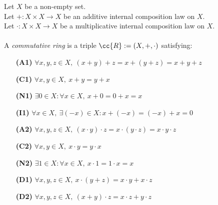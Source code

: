\begin{definition-pre}
    \label{def:commutative_ring}
    Let \(X\) be a non-empty set. \\
    Let \(+: X\times X \to X\) be an additive internal composition law on \(X\). \\
    Let \(\cdot: X\times X \to X\) be a multiplicative internal composition law on \(X\). \\\\
    A \textit{commutative ring} is a triple \(\cc{R}:= (X, +, \cdot)\) satisfying:
    \begin{enumerate}
        \item [\textbf{(A1)}] \(\forall x,y,z\in X,\ (x+y)+z= x+(y+z) = x+y+z\)
        \item [\textbf{(C1)}] \(\forall x,y\in X,\ x+y = y+x\)
        \item [\textbf{(N1)}] \(\exists 0 \in X : \forall x \in X,\ x+0 = 0+x = x\)
        \item [\textbf{(I1)}] \(\forall x \in X,\ \exists (-x)\in X: x+(-x) = (-x)+x = 0\)
        \item [\textbf{(A2)}] \(\forall x,y,z\in X,\ (x\cdot y)\cdot z= x\cdot(y\cdot z) = x\cdot y\cdot z\)
        \item [\textbf{(C2)}] \(\forall x,y\in X,\ x\cdot y = y\cdot x\)
        \item [\textbf{(N2)}] \(\exists 1 \in X : \forall x \in X,\ x\cdot1 = 1\cdot x = x\)
        \item [\textbf{(D1)}] \(\forall x,y,z \in X,\ x\cdot(y+z)=x\cdot y+x\cdot z\)
        \item [\textbf{(D2)}] \(\forall x,y,z \in X,\ (x+y)\cdot z=x\cdot z+y\cdot z\)
    \end{enumerate}
\end{definition-pre}

\begin{definition-pre}[Domain]
    \label{def:domain}
\end{definition-pre}

